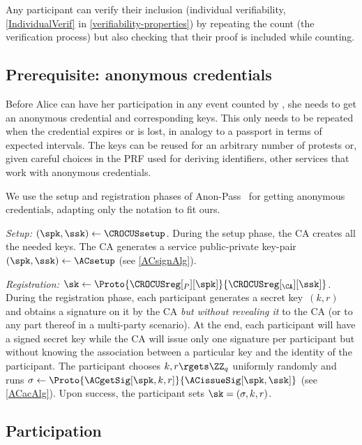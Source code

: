 Any participant can verify their inclusion (individual verifiability, 
\cref{IndividualVerif} in \cref{verifiability-properties}) by repeating the 
count (the verification process) but also checking that their proof is included 
while counting.

\subsection{Prerequisite: anonymous credentials}%
\label{ProtocolSetup}

Before Alice can have her participation in any event counted by
\CROCUS, she needs to get an anonymous credential and corresponding
keys. This only needs to be repeated when the credential expires or is
lost, in analogy to a passport in terms of expected intervals. The
keys can be reused for an arbitrary number of protests or, given
careful choices in the PRF used for deriving identifiers, other
services that work with anonymous credentials. 

We use the setup and registration phases of Anon-Pass~\cite{AnonPass} for
getting anonymous credentials, adapting only the notation to fit ours. 


\emph{Setup: \((\spk, \ssk)\gets \CROCUSsetup\).}
During the setup phase, the \ac{CA} creates all the needed keys.
The \ac{CA} generates a service public-private key-pair \((\spk, \ssk)\gets 
  \ACsetup\) (see \cref{ACsignAlg}).

\emph{Registration: \(\sk\gets 
    \Proto{\CROCUSreg[_P][\spk]}{\CROCUSreg[_{\CA}][\ssk]}\).}
During the registration phase, each participant generates a secret key~\((k, 
  r)\) and obtains a signature on it by the \ac{CA} \emph{but without revealing 
  it} to the \ac{CA} (or to any part thereof in a multi-party scenario).
At the end, each participant will have a signed secret key while the \ac{CA} 
will issue only one signature per participant but without knowing the 
association between a particular key and the identity of the participant.
The participant chooses \(k, r\rgets \ZZ_q\) uniformly randomly and runs 
\(\sigma \gets \Proto{\ACgetSig[\spk, k, r]}{\ACissueSig[\spk, \ssk]}\) (see 
\cref{ACacAlg}).
Upon success, the participant sets \(\sk = (\sigma, k, r)\).



\subsection{Participation}%
\label{ProtocolDuring}


